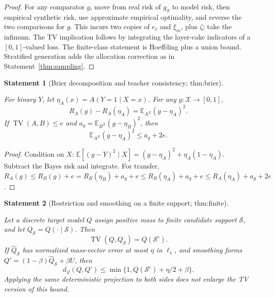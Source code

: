 \documentclass[11pt]{article}
\newtheorem{statement}{Statement}
\newcommand{\E}{\mathbb E}\newcommand{\Prb}{\mathbb P}\newcommand{\ind}{\mathbf 1}
\newcommand{\Q}{\mathcal Q}\newcommand{\Z}{\mathcal Z}\newcommand{\W}{\mathcal W}
\newcommand{\TV}{\operatorname{TV}}\newcommand{\KL}{\operatorname{KL}}
\begin{document}
\begin{proof}
For any comparator $g$, move from real risk of $g_S$ to model risk, then empirical synthetic risk, use approximate empirical optimality, and reverse the two comparisons for $g$. This incurs two copies of $e_\ell$ and $\xi_m$, plus $\zeta$; take the infimum. The TV implication follows by integrating the layer-cake indicators of a $[0,1]$-valued loss. The finite-class statement is Hoeffding plus a union bound. Stratified generation adds the allocation correction as in Statement~\ref{thm:sampling}.
\end{proof}

\begin{statement}[Brier decomposition and teacher consistency; thm:brier]\label{thm:brier}

For binary $Y$, let $\eta_A(x)=A(Y=1\mid X=x)$. For any $g:\mathcal X\to[0,1]$,
\begin{equation}\label{eq:brier}
R_A(g)-R_A(\eta_A)=\E_{A^X}(g-\eta_A)^2.
\end{equation}
If $\TV(A,B)\le e$ and $a_g=\E_{B^X}(g-\eta_B)^2$, then
\begin{equation}
\E_{A^X}(g-\eta_A)^2\le a_g+2e.
\end{equation}

\end{statement}

\begin{proof}
Condition on $X$: $\E[(g-Y)^2\mid X]=(g-\eta_A)^2+\eta_A(1-\eta_A)$. Subtract the Bayes risk and integrate. For transfer, $R_A(g)\le R_B(g)+e=R_B(\eta_B)+a_g+e\le R_B(\eta_A)+a_g+e\le R_A(\eta_A)+a_g+2e$.
\end{proof}

\begin{statement}[Restriction and smoothing on a finite support; thm:finite]\label{thm:finite}

Let a discrete target model $Q$ assign positive mass to finite candidate support $\mathcal S$, and let $Q_{\mathcal S}=Q(\cdot\mid\mathcal S)$. Then
\begin{equation}
\TV(Q,Q_{\mathcal S})=Q(\mathcal S^c).
\end{equation}
If $\widehat Q_{\mathcal S}$ has normalized mass-vector error at most $\eta$ in $\ell_1$, and smoothing forms $Q'=(1-\beta)\widehat Q_{\mathcal S}+\beta U$, then
\begin{equation}\label{eq:finite}
d_\Q(Q,Q')\le\min\{1,Q(\mathcal S^c)+\eta/2+\beta\}.
\end{equation}
Applying the same deterministic projection to both sides does not enlarge the TV version of this bound.

\end{statement}
\end{document}
